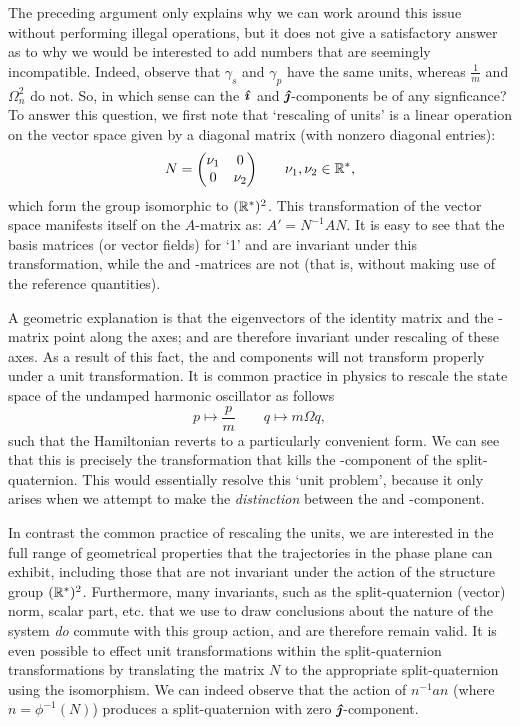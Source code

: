 The preceding argument only explains why we can work around this issue without performing illegal operations, but it does not give a satisfactory answer as to why we would be interested to add numbers that are seemingly incompatible. Indeed, observe that $\gamma_s$ and $\gamma_p$ have the same units, whereas $\tfrac{1}{m}$ and $\Omega_n^2$ do not. So, in which sense can the $\quati$ and $\quatj$-components be of any signficance? To answer this question, we first note that `rescaling of units' is a linear operation on the vector space given by a diagonal matrix (with nonzero diagonal entries): 
$$ N = \mqty(\dmat[0]{\nu_1}{\nu_2}) \qquad \nu_1, \nu_2 \in \real^*, $$
which form the group isomorphic to $(\real^*)^2$. This transformation of the vector space manifests itself on the $A$-matrix as: $ A' = N^{-1}A N$. It is easy to see that the basis matrices (or vector fields) for `1' and \quatk are invariant under this transformation, while the \quati and \quatj-matrices are not (that is, without making use of the reference quantities). 

A geometric explanation is that the eigenvectors of the identity matrix and the \quatk-matrix point along the axes; and are therefore invariant under rescaling of these axes. As a result of this fact, the \quati and \quatj components will not transform properly under a unit transformation. It is common practice in physics to rescale the state space of the undamped harmonic oscillator as follows \cite{Dekker1981,Dedene1980}
$$ p \mapsto \frac{p}{m} \qquad q \mapsto m\Omega q, $$
such that the Hamiltonian reverts to a particularly convenient form. We can see that this is precisely the transformation that kills the \quatj-component of the split-quaternion. This would essentially resolve this `unit problem', because it only arises when we attempt to make the \emph{distinction} between the \quati and \quatj-component.

In contrast the common practice of rescaling the units, we are interested in the full range of geometrical properties that the trajectories in the phase plane can exhibit, including those that are not invariant under the action of the structure group $(\real^*)^2$. Furthermore, many invariants, such as the split-quaternion (vector) norm, scalar part, etc. that we use to draw conclusions about the nature of the system \emph{do} commute with this group action, and are therefore remain valid. It is even possible to effect unit transformations within the split-quaternion transformations by translating the matrix $N$ to the appropriate split-quaternion using the isomorphism. We can indeed observe that the action of $n^{-1} a n$ (where $n = \phi^{-1}(N)$) produces a split-quaternion with zero $\quatj$-component. 

